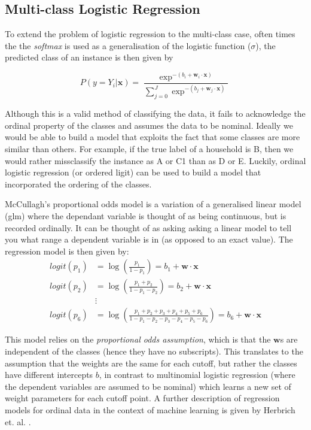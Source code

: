 \subsection{Multi-class Logistic Regression}

To extend the problem of logistic regression to the multi-class case, often times the the \textit{softmax} is used as a generalisation of the logistic function ($\sigma$), the predicted class of an instance is then given by

\[P(y=Y_i|\textbf{x})=\frac{\exp^{-(b_i+\textbf{w}_i\cdot{\textbf{x}})}}{\sum_{j=0}^J\exp^{-(b_j+\textbf{w}_j\cdot{\textbf{x}})}}\]

Although this is a valid method of classifying the data, it fails to acknowledge the ordinal property of the classes and assumes the data to be nominal. Ideally we would be able to build a model that exploits the fact that some classes are more similar than others. For example, if the true label of a household is B, then we would rather missclassify the instance as A or C1 than as D or E. Luckily, ordinal logistic regression (or ordered ligit) can be used to build a model that incorporated the ordering of the classes.

McCullagh's proportional odds model \cite{McCullagh} is a variation of a generalised linear model (glm) where the dependant variable is thought of as being continuous, but is recorded ordinally. It can be thought of as asking asking a linear model to tell you what range a dependent variable is in (as opposed to an exact value). The regression model is then given by: 
\begin{align*}
logit(p_1) &=\log(\frac{p_1}{1-p_1}) = b_1 +\textbf{w}\cdot{\textbf{x}} \\
logit(p_2) &=\log(\frac{p_1+p_2}{1-p_1-p_2}) = b_2 +\textbf{w}\cdot{\textbf{x}}\\
&\vdots \\
logit(p_6) &=\log(\frac{p_1+p_2+p_3+p_4+p_5+p_6}{1-p_1-p_2-p_3-p_4-p_5-p_6}) = b_6 +\textbf{w}\cdot{\textbf{x}}
\end{align*}

This model relies on the \textit{proportional odds assumption}, which is that the $\textbf{w}$s are independent of the classes (hence they have no subscripts). This translates to the assumption that the weights are the same for each cutoff, but rather the classes have different intercepts $b$, in contrast to multinomial logistic regression (where the dependent variables are assumed to be nominal) which learns a new set of weight parameters for each cutoff point. A further description of regression models for ordinal data in the context of machine learning is given by Herbrich et. al. \cite{Herbrich}.

